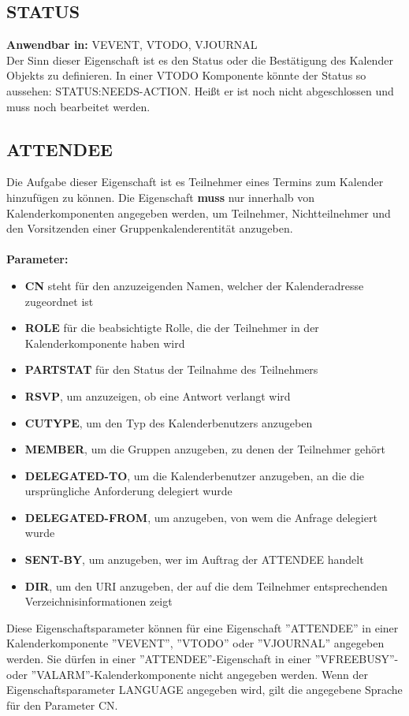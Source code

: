 \subsection{STATUS}
\label{sec:status}
\textbf{Anwendbar in:} VEVENT, VTODO, VJOURNAL\\
Der Sinn dieser Eigenschaft ist es den Status oder die Bestätigung des Kalender Objekts zu definieren. In einer VTODO Komponente könnte der Status so aussehen: STATUS:NEEDS-ACTION. Heißt er ist noch nicht abgeschlossen und muss noch bearbeitet werden.
\subsection{ATTENDEE}
\label{sec:attendee}
Die Aufgabe dieser Eigenschaft ist es Teilnehmer eines Termins zum Kalender hinzufügen zu können. Die Eigenschaft \textbf{muss} nur innerhalb von Kalenderkomponenten angegeben werden, um Teilnehmer, Nichtteilnehmer und den Vorsitzenden einer Gruppenkalenderentität anzugeben. \\ \\ 
\textbf{Parameter:}
\begin{itemize}
 \item \textbf{CN} steht für den anzuzeigenden Namen, welcher der Kalenderadresse zugeordnet ist
 \item \textbf{ROLE} für die beabsichtigte Rolle, die der Teilnehmer in der Kalenderkomponente haben wird
 \item \textbf{PARTSTAT} für den Status der Teilnahme des Teilnehmers
 \item \textbf{RSVP}, um anzuzeigen, ob eine Antwort verlangt wird
 \item \textbf{CUTYPE}, um den Typ des Kalenderbenutzers anzugeben
 \item \textbf{MEMBER}, um die Gruppen anzugeben, zu denen der Teilnehmer gehört
 \item \textbf{DELEGATED-TO}, um die Kalenderbenutzer anzugeben, an die die ursprüngliche Anforderung delegiert wurde
 \item \textbf{DELEGATED-FROM}, um anzugeben, von wem die Anfrage delegiert wurde
 \item \textbf{SENT-BY}, um anzugeben, wer im Auftrag der ATTENDEE handelt
 \item \textbf{DIR}, um den URI anzugeben, der auf die dem Teilnehmer entsprechenden Verzeichnisinformationen zeigt
 \end{itemize} 
Diese Eigenschaftsparameter können für eine Eigenschaft ''ATTENDEE'' in einer Kalenderkomponente ''VEVENT'', ''VTODO'' oder ''VJOURNAL'' angegeben werden. Sie dürfen in einer ''ATTENDEE''-Eigenschaft in einer ''VFREEBUSY''- oder ''VALARM''-Kalenderkomponente nicht angegeben werden. Wenn der Eigenschaftsparameter LANGUAGE angegeben wird, gilt die angegebene Sprache für den Parameter CN. \\ \\
